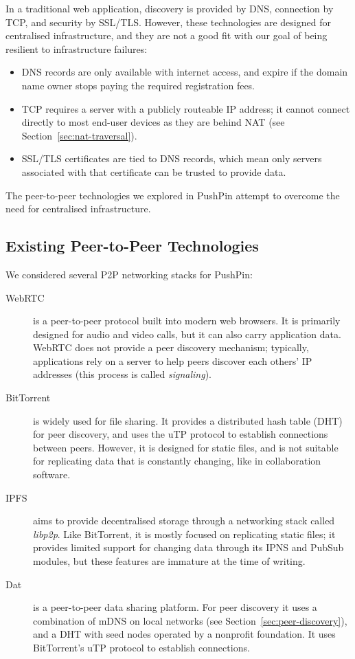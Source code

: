 \documentclass[sigplan,10pt]{acmart}
\begin{document}
In a traditional web application, discovery is provided by DNS, connection by TCP, and security by SSL/TLS.
However, these technologies are designed for centralised infrastructure, and they are not a good fit with our goal of being resilient to infrastructure failures:
\begin{itemize}
    \item DNS records are only available with internet access, and expire if the domain name owner stops paying the required registration fees.
    \item TCP requires a server with a publicly routeable IP address; it cannot connect directly to most end-user devices as they are behind NAT (see Section~\ref{sec:nat-traversal}).
    \item SSL/TLS certificates are tied to DNS records, which mean only servers associated with that certificate can be trusted to provide data.
\end{itemize}

The peer-to-peer technologies we explored in PushPin attempt to overcome the need for centralised infrastructure.

\subsection{Existing Peer-to-Peer Technologies}\label{sec:existing-p2p}

We considered several P2P networking stacks for PushPin:
\begin{description}
\item[WebRTC] is a peer-to-peer protocol built into modern web browsers.
It is primarily designed for audio and video calls, but it can also carry application data. 
WebRTC does not provide a peer discovery mechanism; typically, applications rely on a server to help peers discover each others' IP addresses (this process is called \emph{signaling}).
\item[BitTorrent] is widely used for file sharing.
It provides a distributed hash table (DHT) for peer discovery, and uses the uTP protocol to establish connections between peers.
However, it is designed for static files, and is not suitable for replicating data that is constantly changing, like in collaboration software.
\item[IPFS] aims to provide decentralised storage through a networking stack called \emph{libp2p}.
Like BitTorrent, it is mostly focused on replicating static files; it provides limited support for changing data through its IPNS and PubSub modules, but these features are immature at the time of writing.
\item[Dat] \cite{HowDatWorks,Ogden:2018ur} is a peer-to-peer data sharing platform.
For peer discovery it uses a combination of mDNS on local networks (see Section~\ref{sec:peer-discovery}), and a DHT with seed nodes operated by a nonprofit foundation. It uses BitTorrent's uTP protocol to establish connections.
\end{description}
\end{document}
